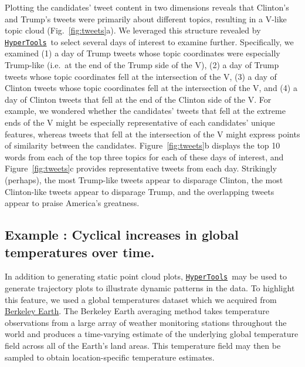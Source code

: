 \documentclass[12pt,letterpaper]{article}
\newcommand{\hypertools}{\href{https://github.com/ContextLab/hypertools}{\texttt{HyperTools}}}
\newcounter{example}
\begin{document}
Plotting the candidates' tweet content in two dimensions reveals that Clinton's and Trump's tweets were primarily about different topics, resulting in a V-like topic cloud (Fig.~\ref{fig:tweets}a).  We leveraged this structure revealed by \hypertools~to select several days of interest to examine further.  Specifically, we examined (1) a day of Trump tweets whose topic coordinates were especially Trump-like (i.e.\ at the end of the Trump side of the V), (2) a day of Trump tweets whose topic coordinates fell at the intersection of the V, (3) a day of Clinton tweets whose topic coordinates fell at the intersection of the V, and (4) a day of Clinton tweets that fell at the end of the Clinton side of the V.  For example, we wondered whether the candidates' tweets that fell at the extreme ends of the V might be especially representative of each candidates' unique features, whereas tweets that fell at the intersection of the V might express points of similarity between the candidates.  Figure~\ref{fig:tweets}b displays the top 10 words from each of the top three topics for each of these days of interest, and Figure~\ref{fig:tweets}c provides representative tweets from each day.  Strikingly (perhaps), the most Trump-like tweets appear to disparage Clinton, the most Clinton-like tweets appear to disparage Trump, and the overlapping tweets appear to praise America's greatness.






\subsection*{Example : Cyclical increases in global temperatures over time.}
In addition to generating static point cloud plots, \hypertools~may be used to generate trajectory plots to illustrate dynamic patterns in the data.  To highlight this feature, we used a global temperatures dataset which we acquired from \href{http://berkeleyearth.lbl.gov/city-list/}{Berkeley Earth}.  The Berkeley Earth averaging method takes temperature observations from a large array of weather monitoring stations throughout the world and produces a time-varying estimate of the underlying global temperature field across all of the Earth's land areas. This temperature field may then be sampled to obtain location-specific temperature estimates.
\end{document}
